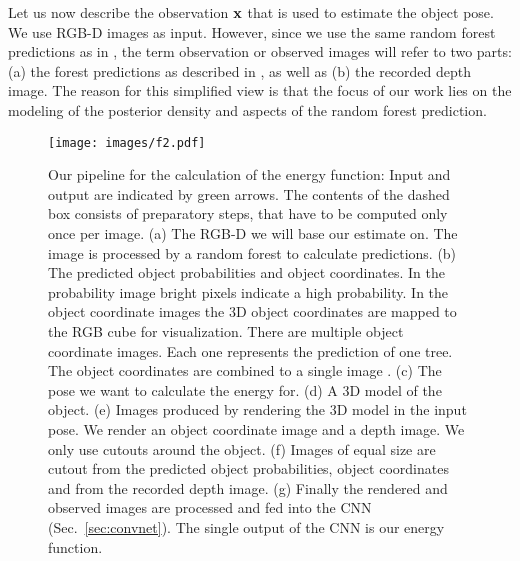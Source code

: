 \documentclass[10pt,letterpaper]{article}
\newcommand{\bx}{{\bf x}}
\begin{document}
Let us now describe the observation $\bx$ that is used to estimate the object pose. We use RGB-D images as input. However, since we use the same random forest predictions as in \cite{brachmann2014}, the term observation or observed images will refer to two parts: (a)
the forest predictions as described in \cite{brachmann2014}, as well as (b) the recorded depth image. The reason for this simplified view is that the focus of our work lies on the modeling of the posterior density and aspects of the random forest prediction.


\begin{figure}[!ht]
\begin{center}
\texttt{[image: images/f2.pdf]}
\end{center}
 \caption{Our pipeline for the calculation of the energy function: Input and output are indicated by green arrows. The contents of the dashed box consists of preparatory steps, that have to be computed only once per image. (a) The RGB-D we will base our estimate on. The image is processed by a random forest to calculate predictions. (b) The predicted object probabilities and object coordinates. In the probability image bright pixels indicate a high probability. In the object coordinate images the 3D object coordinates are mapped to the RGB cube for visualization. There are multiple object coordinate images. Each one represents the prediction of one tree. The object coordinates are combined to a single image \cite{brachmann2014}. (c) The pose we want to calculate the energy for. (d) A 3D model of the object. (e) Images produced by rendering the 3D model in the input pose. We render an object coordinate image and a depth image. We only use cutouts around the object. (f) Images of equal size are cutout from the predicted object probabilities, object coordinates and from the recorded depth image. (g) Finally the rendered  and observed images are processed and fed into the CNN (Sec.~\ref{sec:convnet}). The single output of the CNN is our energy function.}
\label{fig:architecture}
\end{figure}

\end{document}

